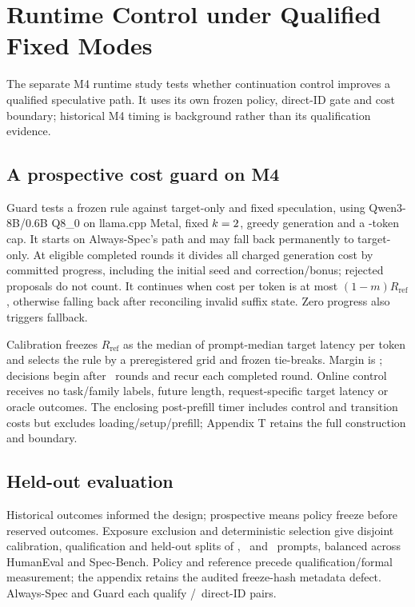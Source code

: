 \section{Runtime Control under Qualified Fixed Modes}
\label{sec:runtime}
The separate M4 runtime study tests whether continuation control improves a qualified speculative path. It uses its own frozen policy, direct-ID gate and cost boundary; historical M4 timing is background rather than its qualification evidence.

\subsection{A prospective cost guard on M4}
Guard tests a frozen rule against target-only and fixed speculation, using Qwen3-8B/0.6B Q8\_0 on llama.cpp Metal, fixed $k=2$, greedy generation and a \RTCap-token cap. It starts on Always-Spec's path and may fall back permanently to target-only. At eligible completed rounds it divides all charged generation cost by committed progress, including the initial seed and correction/bonus; rejected proposals do not count. It continues when cost per token is at most $(1-m)R_{\mathrm{ref}}$, otherwise falling back after reconciling invalid suffix state. Zero progress also triggers fallback.

Calibration freezes $R_{\mathrm{ref}}$ as the median of prompt-median target latency per token and selects the rule by a preregistered grid and frozen tie-breaks. Margin is \RTMargin; decisions begin after \RTRounds\ rounds and recur each completed round. Online control receives no task/family labels, future length, request-specific target latency or oracle outcomes. The enclosing post-prefill timer includes control and transition costs but excludes loading/setup/prefill; Appendix T retains the full construction and boundary.

\subsection{Held-out evaluation}
Historical outcomes informed the design; prospective means policy freeze before reserved outcomes. Exposure exclusion and deterministic selection give disjoint calibration, qualification and held-out splits of \RTCalibration, \RTQualification\ and \RTPrompts\ prompts, balanced across HumanEval and Spec-Bench. Policy and reference precede qualification/formal measurement; the appendix retains the audited freeze-hash metadata defect. Always-Spec and Guard each qualify \RTQualPairs/\RTQualPairs\ direct-ID pairs.

